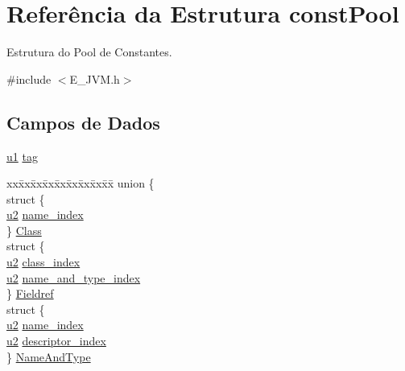 \hypertarget{structconst_pool}{}\section{Referência da Estrutura const\+Pool}
\label{structconst_pool}


Estrutura do Pool de Constantes.  




{\ttfamily \#include $<$E\+\_\+\+J\+V\+M.\+h$>$}

\subsection*{Campos de Dados}
\begin{DoxyCompactItemize}
\item 
\hyperlink{_e___j_v_m_8h_a216a9f8b04b4f0af84a4ca9d1d85a6ca}{u1} \hyperlink{structconst_pool_a876197bb013e214c071ab56d1de8ed25}{tag}
\item 
\begin{tabbing}
xx\=xx\=xx\=xx\=xx\=xx\=xx\=xx\=xx\=\kill
union \{\\
\>struct \{\\
\>\>\hyperlink{_e___j_v_m_8h_a5f223212eef04d10a4550ded680cb1cf}{u2} \hyperlink{structconst_pool_af3f5f8cd6fcae23720d11786466944e1}{name\_index}\\
\>\} \hyperlink{structconst_pool_a3735adf769a89a8579d9c729d9ea852b}{Class}\\
\>struct \{\\
\>\>\hyperlink{_e___j_v_m_8h_a5f223212eef04d10a4550ded680cb1cf}{u2} \hyperlink{structconst_pool_ac2f1017863a461470285ceffa2487892}{class\_index}\\
\>\>\hyperlink{_e___j_v_m_8h_a5f223212eef04d10a4550ded680cb1cf}{u2} \hyperlink{structconst_pool_a3dde2ae699efaa1736b684038ea4f3de}{name\_and\_type\_index}\\
\>\} \hyperlink{structconst_pool_a2d445b84752ddea1db4ef9f3ce2fee02}{Fieldref}\\
\>struct \{\\
\>\>\hyperlink{_e___j_v_m_8h_a5f223212eef04d10a4550ded680cb1cf}{u2} \hyperlink{structconst_pool_af3f5f8cd6fcae23720d11786466944e1}{name\_index}\\
\>\>\hyperlink{_e___j_v_m_8h_a5f223212eef04d10a4550ded680cb1cf}{u2} \hyperlink{structconst_pool_a09a23db7ae9a3429931f2a5447f9f7fe}{descriptor\_index}\\
\>\} \hyperlink{structconst_pool_a727268ed0e1405a5eaab1aa5ad3cba74}{NameAndType}\\

\end{tabbing}
\end{DoxyCompactItemize}
